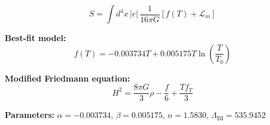 
\begin{equation}
  S = \int d^4x \, |e| \, \frac{1}{16\pi G} \left[ f(T) + \mathcal{L}_m \right]
\end{equation}

\textbf{Best-fit model:}
\begin{equation}
  f(T) = -0.003734 T + 0.005175 T \ln\!\left(\frac{T}{T_0}\right)
\end{equation}

\textbf{Modified Friedmann equation:}
\begin{equation}
  H^2 = \frac{8\pi G}{3} \rho - \frac{f}{6} + \frac{T f_T}{3}
\end{equation}

\textbf{Parameters:}
$\alpha = -0.003734$, \quad
$\beta = 0.005175$, \quad
$n = 1.5830$, \quad
$\Lambda_{\text{BI}} = 535.9452$